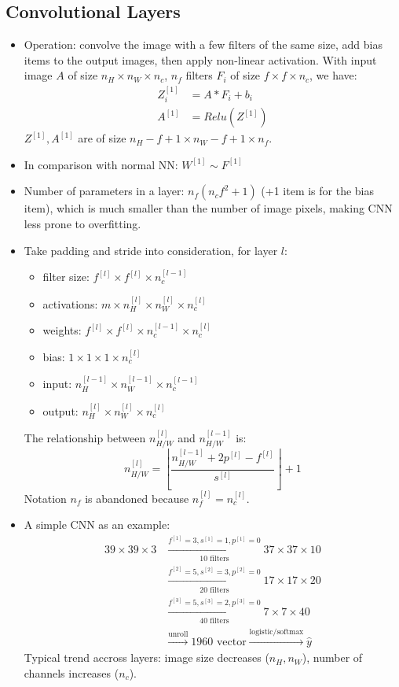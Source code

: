 \subsection{Convolutional Layers}
\begin{itemize}
  \item Operation: convolve the image with a few filters of the same size, add bias items to the output images, then apply non-linear activation. With input image $A$ of size $n_H\times n_W\times n_c$, $n_f$ filters $F_i$ of size $f\times f\times n_c$, we have:
  \begin{align*}
    Z^{[1]}_i&=A*F_i + b_i\\
    A^{[1]}&=Relu\left(Z^{[1]}\right)
  \end{align*}
  $Z^{[1]}, A^{[1]}$ are of size $n_H-f+1\times n_W-f+1\times n_f$.
  \item In comparison with normal NN: $W^{[1]}\sim F^{[1]}$
  \item Number of parameters in a layer: $n_f\left(n_cf^2 + 1\right)$ (+1 item is for the bias item), which is much smaller than the number of image pixels, making CNN less prone to overfitting.
  \item Take padding and stride into consideration, for layer $l$: 
  \begin{itemize}
      \item filter size: $f^{[l]}\times f^{[l]}\times n_c^{[l-1]}$
      \item activations: $m\times n_H^{[l]}\times n_W^{[l]}\times n_c^{[l]}$
      \item weights: $f^{[l]}\times f^{[l]}\times n_c^{[l-1]}\times n_c^{[l]}$
      \item bias: $1\times 1\times 1\times n_c^{[l]}$
      \item input: $n_H^{[l-1]}\times n_W^{[l-1]}\times n_c^{[l-1]}$
      \item output: $n_H^{[l]}\times n_W^{[l]}\times n_c^{[l]}$
  \end{itemize}
  The relationship between $n^{[l]}_{H/W}$ and $n^{[l-1]}_{H/W}$ is:
  \[n^{[l]}_{H/W}=\left\lfloor\frac{n^{[l-1]}_{H/W}+2p^{[l]}-f^{[l]}}{s^{[l]}}\right\rfloor+1\]
  Notation $n_f$ is abandoned because $n_f^{[l]}=n_c^{[l]}$.
  \item A simple CNN as an example:
  \begin{align*}
    39\times 39\times 3&\xrightarrow[10\text{ filters}]{f^{[1]}=3,s^{[1]}=1,p^{[1]}=0}37\times 37\times 10\\
    &\xrightarrow[20\text{ filters}]{f^{[2]}=5,s^{[2]}=3,p^{[2]}=0}17\times 17\times 20\\
    &\xrightarrow[40\text{ filters}]{f^{[3]}=5,s^{[3]}=2,p^{[3]}=0}7\times 7\times 40\\
    &\xrightarrow{\text{unroll}}1960\text{ vector}\xrightarrow{\text{logistic/softmax}}\hat{y}
  \end{align*}
  Typical trend accross layers: image size decreases ($n_H, n_W$), number of channels increases ($n_c$).
\end{itemize}
